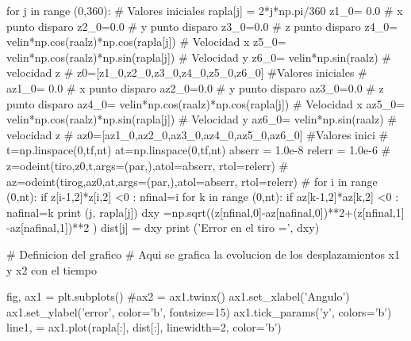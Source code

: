 \documentclass{article}
\begin{document}
\begin{python}
for j in range (0,360):
# Valores iniciales
  rapla[j] = 2*j*np.pi/360
  z1_0= 0.0  # x punto disparo
  z2_0=0.0  # y punto disparo
  z3_0=0.0  # z punto disparo
  z4_0= velin*np.cos(raalz)*np.cos(rapla[j])  # Velocidad x 
  z5_0= velin*np.cos(raalz)*np.sin(rapla[j])  # Velocidad y
  z6_0= velin*np.sin(raalz)   # velocidad z
#  
  z0=[z1_0,z2_0,z3_0,z4_0,z5_0,z6_0] #Valores iniciales   
#
  az1_0= 0.0  # x punto disparo
  az2_0=0.0  # y punto disparo
  az3_0=0.0  # z punto disparo
  az4_0= velin*np.cos(raalz)*np.cos(rapla[j])  # Velocidad x 
  az5_0= velin*np.cos(raalz)*np.sin(rapla[j])  # Velocidad y
  az6_0= velin*np.sin(raalz)   # velocidad z
#
  az0=[az1_0,az2_0,az3_0,az4_0,az5_0,az6_0] #Valores inici
# 
  t=np.linspace(0,tf,nt)
  at=np.linspace(0,tf,nt)
  abserr = 1.0e-8
  relerr = 1.0e-6
#
  z=odeint(tiro,z0,t,args=(par,),atol=abserr, rtol=relerr)
#
  az=odeint(tirog,az0,at,args=(par,),atol=abserr, rtol=relerr)
#
  for i in range (0,nt): 
     if z[i-1,2]*z[i,2] <0 : nfinal=i
  for k in range (0,nt): 
     if az[k-1,2]*az[k,2] <0 : nafinal=k
  print (j, rapla[j])
  dxy =np.sqrt((z[nfinal,0]-az[nafinal,0])**2+(z[nfinal,1] -az[nafinal,1])**2 )
  dist[j] = dxy
  print ('Error en el tiro =', dxy)

# Definicion del grafico
# Aqui se grafica la evolucion de los desplazamientos x1 y x2 con el tiempo

fig, ax1 = plt.subplots()
#ax2 = ax1.twinx()
ax1.set_xlabel('Angulo')
ax1.set_ylabel('error', color='b', fontsize=15)
ax1.tick_params('y', colors='b')
line1, = ax1.plot(rapla[:], dist[:], linewidth=2, color='b')

\end{python}
\end{document}
